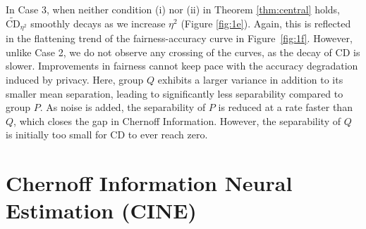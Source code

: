 \documentclass[11pt,letterpaper]{article}
\begin{document}



 In Case 3, when neither condition (i) nor (ii) in Theorem \ref{thm:central} holds, $\widetilde{\text{CD}}_{\eta^2}$ smoothly decays as we increase $\eta^2$ (Figure \ref{fig:1e}). Again, this is reflected in the flattening trend of the fairness-accuracy curve in Figure~\ref{fig:1f}. However, unlike Case 2, we do not observe any crossing of the curves, as the decay of CD is slower. Improvements in fairness cannot keep pace with the accuracy degradation induced by privacy.
 Here, group $Q$ exhibits a larger variance in addition to its smaller mean separation, leading to significantly less separability compared to group $P$. As noise is added, the separability of $P$ is reduced at a rate faster than $Q$, which closes the gap in Chernoff Information. However, the separability of $Q$ is initially too small for CD to ever reach zero.







\section{Chernoff Information Neural Estimation (CINE)}\label{sec:estimation}
\end{document}
